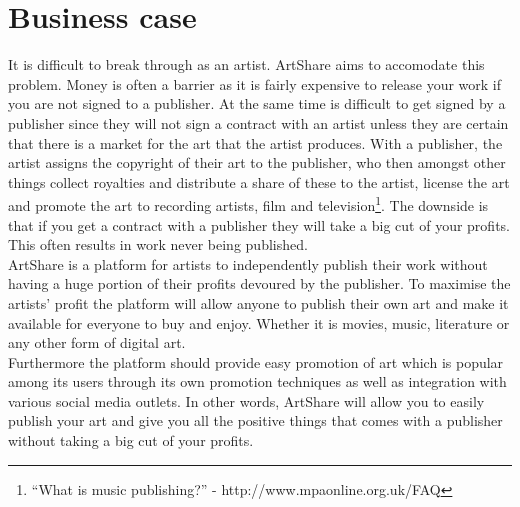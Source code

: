 \documentclass[../report.tex]{subfiles}
\begin{document}
\section{Business case}
It is difficult to break through as an artist. ArtShare aims to accomodate this problem. Money is often a barrier as it is fairly expensive to release your work if you are not signed to a publisher. At the same time is difficult to get signed by a publisher since they will not sign a contract with an artist unless they are certain that there is a market for the art that the artist produces. With a publisher, the artist assigns the copyright of their art to the publisher, who then amongst other things collect royalties and distribute a share of these to the artist, license the art and promote the art to recording artists, film and television\footnote{``What is music publishing?'' - http://www.mpaonline.org.uk/FAQ}. The downside is that if you get a contract with a publisher they will take a big cut of your profits. This often results in work never being published.\\

\noindent ArtShare is a platform for artists to independently publish their work without having a huge portion of their profits devoured by the publisher. To maximise the artists' profit the platform will allow anyone to publish their own art and make it available for everyone to buy and enjoy. Whether it is movies, music, literature or any other form of digital art.\\

\noindent Furthermore the platform should provide easy promotion of art which is popular among its users through its own promotion techniques as well as integration with various social media outlets. In other words, ArtShare will allow you to easily publish your art and give you all the positive things that comes with a publisher without taking a big cut of your profits. 


\end{document}

